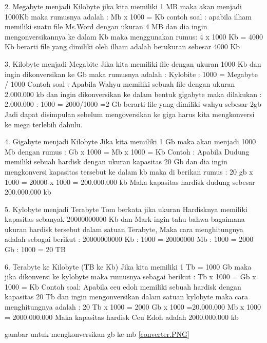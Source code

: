 2. Megabyte menjadi Kilobyte
jika kita memiliki 1 MB maka akan menjadi 1000Kb maka rumusnya adalah :
Mb x 1000 = Kb
contoh soal :
apabila ilham memiliki suatu file Ms.Word dengan ukuran 4 MB dan dia ingin mengonversikannya ke dalam Kb maka menggunakan rumus: 
4 x 1000 Kb = 4000 Kb
berarti file yang dimiliki oleh ilham adalah berukuran sebesar 4000 Kb

3. Kilobyte menjadi Megabite
Jika kita memiliki file dengan ukuran 1000 Kb dan ingin dikonversikan ke Gb maka rumusnya adalah :
Kylobite : 1000 = Megabyte / 1000
Contoh soal :
Apabila Wahyu memiliki sebuah file dengan ukuran 2.000.000 kb dan ingin dikonversikan ke dalam bentuk gigabyte maka dilakukan :
2.000.000 : 1000 = 2000/1000
=2 Gb
berarti file yang dimiliki wahyu sebesar 2gb
Jadi dapat disimpulan sebelum mengoversikan ke giga harus kita mengkonversi ke mega terlebih dahulu.

4.	Gigabyte menjadi Kilobyte
Jika kita memiliki 1 Gb maka akan menjadi 1000 Mb dengan rumus :
Gb x 1000 = Mb x 1000
= Kb
Contoh : 
Apabila Dudung memiliki sebuah hardisk dengan ukuran kapasitas 20 Gb dan dia ingin mengkonversi kapasitas tersebut ke dalam kb maka di berikan rumus :
20 gb x 1000 = 20000 x 1000
= 200.000.000 kb
Maka kapasitas hardisk dudung sebesar 200.000.000 kb

5.	Kylobyte menjadi Terabyte 
Tom berkata jika ukuran Hardisknya memiliki kapasitas sebanyak 20000000000 Kb dan Mark ingin tahu bahwa bagaimana ukuran hardisk tersebut dalam satuan Terabyte, Maka cara menghitungnya adalah sebagai berikut :
20000000000 Kb : 1000 = 20000000 Mb : 1000 = 2000 Gb : 1000 = 20 TB

6.	Terabyte ke Kilobyte (TB ke Kb)
Jika kita memiliki 1 Tb = 1000 Gb maka jika dikonversi ke kylobyte maka rumusnya sebagai berikut :
Tb x 1000 = Gb x 1000 = Kb
Contoh soal:
Apabila ceu edoh memiliki sebuah hardisk dengan kapasitas 20 Tb dan ingin mengonversikan dalam satuan kylobyte maka cara menghitungnya adalah :
20 Tb x 1000 = 2000 Gb x 1000 
=20.000.000 Mb x 1000 = 2000.000.000
Maka kapasitas hardisk Ceu Edoh adalah 2000.000.000 kb

gambar untuk mengkonversikan gb ke mb \ref{converter.PNG}

